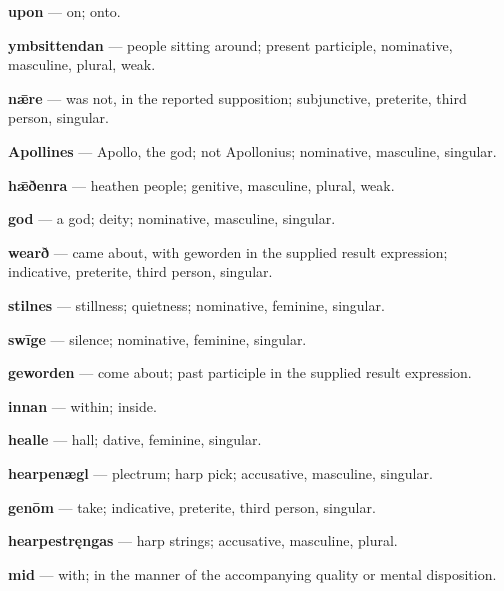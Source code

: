 \textbf{upon} — on; onto.

\textbf{ymbsittendan} — people sitting around; present participle, nominative, masculine, plural, weak.

\textbf{nǣre} — was not, in the reported supposition; subjunctive, preterite, third person, singular.

\textbf{Apollines} — Apollo, the god; not Apollonius; nominative, masculine, singular.

\textbf{hǣðenra} — heathen people; genitive, masculine, plural, weak.

\textbf{god} — a god; deity; nominative, masculine, singular.

\textbf{wearð} — came about, with geworden in the supplied result expression; indicative, preterite, third person, singular.

\textbf{stilnes} — stillness; quietness; nominative, feminine, singular.

\textbf{swīge} — silence; nominative, feminine, singular.

\textbf{geworden} — come about; past participle in the supplied result expression.

\textbf{innan} — within; inside.

\textbf{healle} — hall; dative, feminine, singular.

\textbf{hearpenægl} — plectrum; harp pick; accusative, masculine, singular.

\textbf{genōm} — take; indicative, preterite, third person, singular.

\textbf{hearpestręngas} — harp strings; accusative, masculine, plural.

\textbf{mid} — with; in the manner of the accompanying quality or mental disposition.

